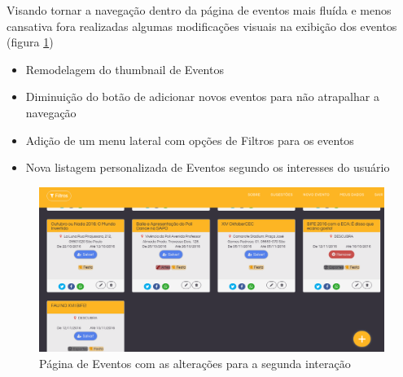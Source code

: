 \par Visando tornar a navegação dentro da página de eventos mais fluída e menos cansativa fora realizadas algumas modificações visuais na exibição dos eventos (figura  \ref{fig:events_pagev2})
\begin{itemize}
\item Remodelagem do thumbnail de Eventos
\item Diminuição do botão de adicionar novos eventos para não atrapalhar a navegação
\item Adição de um menu lateral com opções de Filtros para os eventos
\item Nova listagem personalizada de Eventos segundo os interesses do usuário
\end{itemize}
        \begin{figure}[htb]
		\includegraphics[width=15cm]{figuras/events_pagev2}
		\caption{\label{fig:events_pagev2} Página de Eventos com as alterações para a segunda interação}
		\end{figure}

